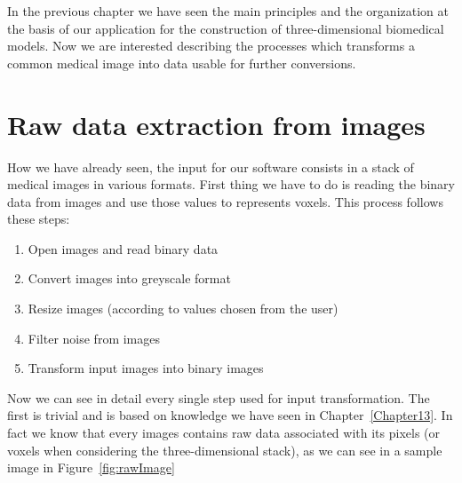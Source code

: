 In the previous chapter we have seen the main principles and the organization at the basis of our application for the construction of three-dimensional biomedical models. Now we are interested describing the processes which transforms a common medical image into data usable for further conversions.

\section{Raw data extraction from images}\label{sec32:DataExtraction}

How we have already seen, the input for our software consists in a stack of medical images in various formats. First thing we have to do is reading the binary data from images and use those values to represents voxels. This process follows these steps:
\begin{enumerate}
 \item Open images and read binary data
 \item Convert images into greyscale format
 \item Resize images (according to values chosen from the user)
 \item Filter noise from images
 \item Transform input images into binary images
\end{enumerate}

Now we can see in detail every single step used for input transformation. The first is trivial and is based on knowledge we have seen in Chapter~\ref{Chapter13}. In fact we know that every images contains raw data associated with its pixels (or voxels when considering the three-dimensional stack), as we can see in a sample image in Figure~\ref{fig:rawImage}

